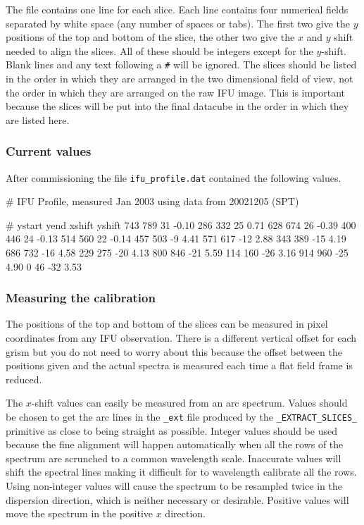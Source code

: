 \documentclass[twoside,11pt,nolof]{starlink}
\begin{document}
The file contains one line for each slice. Each line contains four
numerical fields separated by white space (any number of spaces or
tabs). The first two give the $y$ positions of the top and bottom of
the slice, the other two give the $x$ and $y$ shift needed to align
the slices. All of these should be integers except for the
$y$-shift. Blank lines and any text following a \texttt{\#} will be
ignored. The slices should be listed in the order in which they are
arranged in the two dimensional field of view, not the order in which
they are arranged on the raw IFU image. This is important because the
slices will be put into the final datacube in the order in which they
are listed here.


\subsubsection{Current values}

After commissioning the file \texttt{ifu\_profile.dat} contained the
following values.

\begin{terminalv}
      # IFU Profile, measured Jan 2003 using data from 20021205 (SPT)

      # ystart   yend  xshift  yshift
          743     789      31   -0.10
          286     332      25    0.71
          628     674      26   -0.39
          400     446      24   -0.13
          514     560      22   -0.14
          457     503      -9    4.41
          571     617     -12    2.88
          343     389     -15    4.19
          686     732     -16    4.58
          229     275     -20    4.13
          800     846     -21    5.59
          114     160     -26    3.16
          914     960     -25    4.90
            0      46     -32    3.53
\end{terminalv}


\subsubsection{Measuring the calibration}

The positions of the top and bottom of the slices can be measured in
pixel coordinates from any IFU observation. There is a different
vertical offset for each grism but you do not need to worry about
this because the offset between the positions given and the actual
spectra is measured each time a flat field frame is reduced.

The $x$-shift values can easily be measured from an arc spectrum.
Values should be chosen to get the arc lines in the \texttt{\_ext} file
produced by the \texttt{\_EXTRACT\_SLICES\_} primitive as close to being
straight as possible. Integer values should be used because the fine
alignment will happen automatically when all the rows of the spectrum
are scrunched to a common wavelength scale. Inaccurate values will
shift the spectral lines making it difficult for  to wavelength calibrate all the rows.  Using
non-integer values will cause the spectrum to be resampled twice in
the dispersion direction, which is neither necessary or desirable.
Positive values will move the spectrum in the positive $x$ direction.
\end{document}
